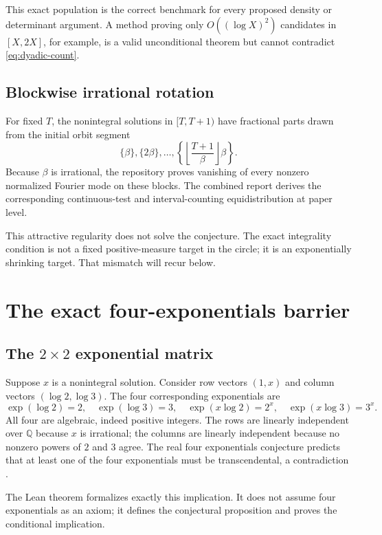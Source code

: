 \documentclass[11pt,oneside]{article}
\theoremstyle{definition}
\theoremstyle{remark}
\newcommand{\Q}{\mathbb Q}
\begin{document}
This exact population is the correct benchmark for every proposed density or determinant
argument.  A method proving only $O((\log X)^2)$ candidates in $[X,2X]$, for example, is a
valid unconditional theorem but cannot contradict \eqref{eq:dyadic-count}.

\subsection{Blockwise irrational rotation}

For fixed $T$, the nonintegral solutions in $[T,T+1)$ have fractional parts drawn from the
initial orbit segment
\[
 \{\beta\},\{2\beta\},\ldots,
 \left\{\left\lfloor\frac{T+1}{\beta}\right\rfloor\beta\right\}.
\]
Because $\beta$ is irrational, the repository proves vanishing of every nonzero normalized
Fourier mode on these blocks.  The combined report derives the corresponding continuous-test
and interval-counting equidistribution at paper level.

This attractive regularity does not solve the conjecture.  The exact integrality condition is
not a fixed positive-measure target in the circle; it is an exponentially shrinking target.
That mismatch will recur below.

\section{The exact four-exponentials barrier}
\label{sec:four-exp}

\subsection{The $2\times2$ exponential matrix}

Suppose $x$ is a nonintegral solution.  Consider row vectors $(1,x)$ and column vectors
$(\log2,\log3)$.  The four corresponding exponentials are
\[
 \exp(\log2)=2,
 \quad \exp(\log3)=3,
 \quad \exp(x\log2)=2^x,
 \quad \exp(x\log3)=3^x.
\]
All four are algebraic, indeed positive integers.  The rows are linearly independent over
$\Q$ because $x$ is irrational; the columns are linearly independent because no nonzero
powers of $2$ and $3$ agree.  The real four exponentials conjecture predicts that at least one
of the four exponentials must be transcendental, a contradiction \cite{Waldschmidt2000,Waldschmidt2005}.

The Lean theorem
formalizes exactly this implication.  It does not assume four exponentials as an axiom; it
defines the conjectural proposition and proves the conditional implication.
\end{document}
